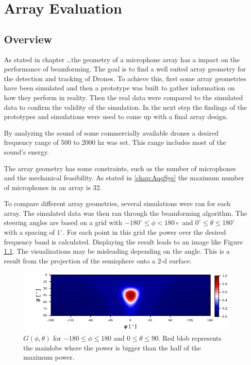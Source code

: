 \chapter{Array Evaluation}
\label{chap:aev}
\section{Overview}
As stated in chapter \dots the geometry of a microphone array
has a impact on the performance of beamforming.
The goal is to find a well suited array geometry for the detection and tracking of
Drones.
To achieve this, first some array geometries have been simulated and then
a prototype was built to gather information on how they perform in reality.
Then the real data were compared to the simulated data to
confirm the validity of the simulation.
In the next step the findings of the prototypes and simulations
were used to come up with a final array design.

By analyzing the sound of some commercially available drones
a desired frequency range of 500 to 2000 hz was set.
This range includes most of the sound's energy.

The array geometry has some constraints,
such as the number of microphones and the mechanical feasibility.
As stated in \ref*{chap:AqqSys} the maximum number of microphones 
in an array is 32.

To compare different array geometries, several simulations
were ran for each array.
The simulated data was then ran through the beamforming
algorithm.
The steering angles are based on a grid with $-180^\circ \leq \phi < 180\circ$ and
$0^\circ \leq \theta \leq 180^\circ$ with a spacing of $1^\circ$.
For each point in this grid the power over the desired frequency band is calculated.
Displaying the result leads to an image like Figure \ref*{aev:fig:gridEx}.
The visualizations may be misleading depending on the angle.
This is a result from the projection of the semisphere onto a 2-d surface.
\begin{figure}
	\centering
	\includegraphics[]{images/5_array_evaluation/0.3_0.79.pdf}
	\caption{$G(\phi, \theta)$ for $-180 \leq \phi \leq 180$ and $0 \leq \theta \leq 90$.
	Red blob represents the mainlobe where the power is bigger than the half of the 
	maximum power.}
	\label{aev:fig:gridEx}
\end{figure}
